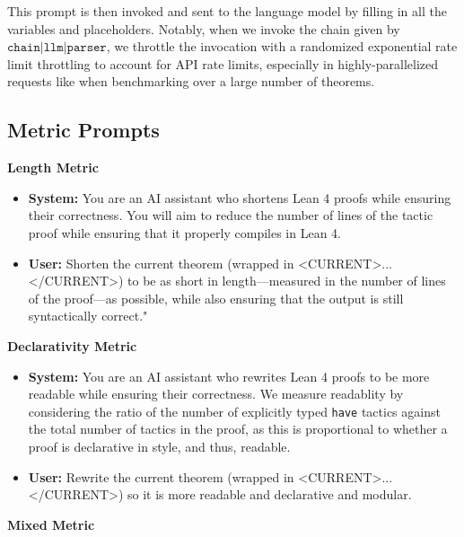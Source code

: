 This prompt is then invoked and sent to the language model by filling in all the variables and placeholders. Notably, when we invoke the chain given by $\texttt{chain} | \texttt{llm} | \texttt{parser}$, we throttle the invocation with a randomized exponential rate limit throttling to account for API rate limits, especially in highly-parallelized requests like when benchmarking over a large number of theorems.




\subsection{Metric Prompts}



\textbf{Length Metric}

\begin{itemize}
    \item[]\textbf{System:} You are an AI assistant who shortens Lean 4 proofs while ensuring their correctness. You will aim to reduce the number of lines of the tactic proof while ensuring that it properly compiles in Lean 4.
    \item[]\textbf{User:} Shorten the current theorem (wrapped in <CURRENT>...</CURRENT>) to be as short in length—measured in the number of lines of the proof—as possible, while also ensuring that the output is still syntactically correct."
\end{itemize}


\textbf{Declarativity Metric}

\begin{itemize}
    \item[]\textbf{System:} You are an AI assistant who rewrites Lean 4 proofs to be more readable while ensuring their correctness. We measure readablity by considering the ratio of the number of explicitly typed \texttt{have} tactics against the total number of tactics in the proof, as this is proportional to whether a proof is declarative in style, and thus, readable.
    \item[]\textbf{User:} Rewrite the current theorem (wrapped in <CURRENT>...</CURRENT>) so it is more readable and declarative and modular. 
\end{itemize}



\textbf{Mixed Metric}

